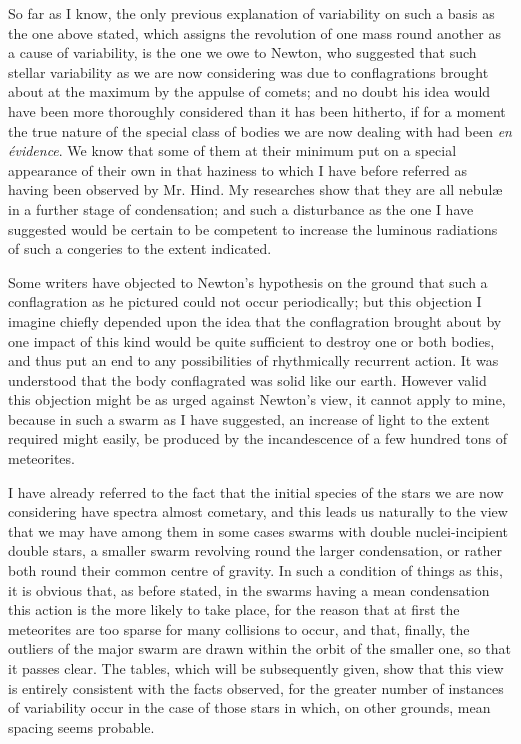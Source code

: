\documentclass[a4paper, 12pt, oneside, polutonikogreek, english]{article}
\begin{document}
So far as I know, the only previous explanation of variability on such a basis as the one above stated, which assigns the revolution of one mass round another as a cause of variability, is the one we owe to Newton, who suggested that such stellar variability as we are now considering was due to conflagrations brought about at the maximum by the appulse of comets; and no doubt his idea would have been more thoroughly considered than it has been hitherto, if for a moment the true nature of the special class of bodies we are now dealing with had been \emph{en évidence}. We know that some of them at their minimum put on a special appearance of their own in that haziness to which I have before referred as having been observed by Mr. Hind. My researches show that they are all nebulæ in a further stage of condensation; and such a disturbance as the one I have suggested would be certain to be competent to increase the luminous radiations of such a congeries to the extent indicated.

Some writers have objected to Newton's hypothesis on the ground that such a conflagration as he pictured could not occur periodically; but this objection I imagine chiefly depended upon the idea that the conflagration brought about by one impact of this kind would be quite sufficient to destroy one or both bodies, and thus put an end to any possibilities of rhythmically recurrent action. It was understood that the body conflagrated was solid like our earth. However valid this objection might be as urged against Newton's view, it cannot apply to mine, because in such a swarm as I have suggested, an increase of light to the extent required might easily, be produced by the incandescence of a few hundred tons of meteorites.

I have already referred to the fact that the initial species of the stars we are now considering have spectra almost cometary, and this leads us naturally to the view that we may have among them in some cases swarms with double nuclei-incipient double stars, a smaller swarm revolving round the larger condensation, or rather both round their common centre of gravity. In such a condition of things as this, it is obvious that, as before stated, in the swarms having a mean condensation this action is the more likely to take place, for the reason that at first the meteorites are too sparse for many collisions to occur, and that, finally, the outliers of the major swarm are drawn within the orbit of the smaller one, so that it passes clear. The tables, which will be subsequently given, show that this view is entirely consistent with the facts observed, for the greater number of instances of variability occur in the case of those stars in which, on other grounds, mean spacing seems probable.
\end{document}
